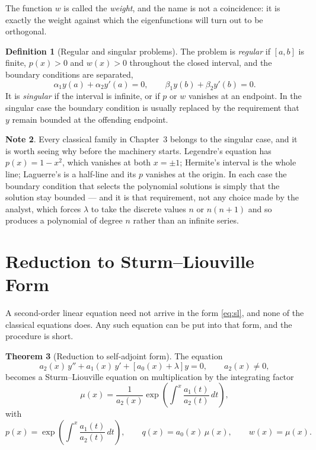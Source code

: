 \documentclass[12pt,a4paper]{report}
\theoremstyle{definition}
\newtheorem{thm}{Theorem}[section]
\newtheorem{defn}[thm]{Definition}
\newtheorem{note}[thm]{Note}
\theoremstyle{plain}
\begin{document}
The function $w$ is called the \emph{weight}, and the name is not a coincidence:
it is exactly the weight against which the eigenfunctions will turn out to be
orthogonal.

\begin{defn}[Regular and singular problems]
The problem is \emph{regular} if $[a,b]$ is finite, $p(x)>0$ and $w(x)>0$
throughout the closed interval, and the boundary conditions are separated,
$$\alpha_1 y(a) + \alpha_2 y'(a) = 0,\qquad
\beta_1 y(b) + \beta_2 y'(b) = 0 .$$
It is \emph{singular} if the interval is infinite, or if $p$ or $w$ vanishes at
an endpoint. In the singular case the boundary condition is usually replaced by
the requirement that $y$ remain bounded at the offending endpoint.
\end{defn}

\begin{note}
Every classical family in Chapter~3 belongs to the singular case, and it is
worth seeing why before the machinery starts. Legendre's equation has
$p(x)=1-x^{2}$, which vanishes at both $x=\pm1$; Hermite's interval is the whole
line; Laguerre's is a half-line and its $p$ vanishes at the origin. In each case
the boundary condition that selects the polynomial solutions is simply that the
solution stay bounded --- and it is that requirement, not any choice made by the
analyst, which forces $\lambda$ to take the discrete values $n$ or $n(n+1)$ and
so produces a polynomial of degree $n$ rather than an infinite series.
\end{note}

\section{Reduction to Sturm--Liouville Form}

A second-order linear equation need not arrive in the form \eqref{eq:sl}, and
none of the classical equations does. Any such equation can be put into that
form, and the procedure is short.

\begin{thm}[Reduction to self-adjoint form]
\label{thm:reduce}
The equation
$$a_2(x)\,y'' + a_1(x)\,y' + \left[a_0(x)+\lambda\right]y = 0,
\qquad a_2(x)\neq 0,$$
becomes a Sturm--Liouville equation on multiplication by the integrating factor
$$\mu(x) = \frac{1}{a_2(x)}\exp\left(\int^{x}\frac{a_1(t)}{a_2(t)}\,dt\right),$$
with
$$p(x) = \exp\left(\int^{x}\frac{a_1(t)}{a_2(t)}\,dt\right),
\qquad q(x) = a_0(x)\,\mu(x),
\qquad w(x) = \mu(x).$$
\end{thm}
\end{document}
